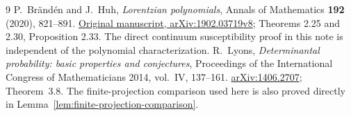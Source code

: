 \documentclass[11pt]{article}
\theoremstyle{remark}\newtheorem{remark}[theorem]{Remark}
\begin{document}
\begin{thebibliography}{9}
P.~Br\"and\'en and J.~Huh,
\emph{Lorentzian polynomials}, Annals of Mathematics
\textbf{192} (2020), 821--891.
\href{https://arxiv.org/pdf/1902.03719}{Original manuscript,
arXiv:1902.03719v8}; Theorems 2.25 and 2.30, Proposition 2.33.
The direct continuum susceptibility proof in this note is independent
of the polynomial characterization.
R.~Lyons,
\emph{Determinantal probability: basic properties and conjectures},
Proceedings of the International Congress of Mathematicians 2014,
vol.~IV, 137--161.
\href{https://arxiv.org/abs/1406.2707}{arXiv:1406.2707}; Theorem~3.8.
The finite-projection comparison used here is also proved directly
in Lemma~\ref{lem:finite-projection-comparison}.
\end{thebibliography}
\end{document}
